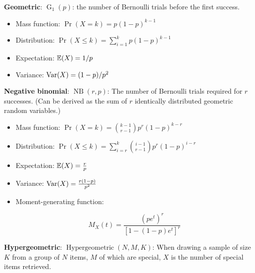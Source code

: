 \textbf{Geometric}:  \(\operatorname{G}_1(p)\): the number of Bernoulli trials before the first success.

\begin{itemize}

\item Mass function: \(\Pr(X = k) = p(1-p)^{k-1} \)

\item Distribution: \(\Pr(X \leq k) = \sum_{i=1}^k p(1-p)^{k-1}  \)

\item Expectation: \(\mathbb{E}(X) = 1/p \)

\item Variance: \(\mathrm{Var}(X) = (1-p)/p^2\)

\end{itemize}


\textbf{Negative binomial}: \( \operatorname{NB}(r, p)\): The number of Bernoulli trials required for \(r\) successes. (Can be derived as the sum of \(r\) identically distributed geometric random variables.)

\begin{itemize}

\item Mass function: \(\Pr(X = k) =  \binom{k-1}{r-1} p^r (1-p)^{k-r}\)

\item Distribution: \(\Pr(X \leq k) = \sum_{i=r}^k \binom{i-1}{r-1} p^r (1-p)^{i-r} \)

\item Expectation: \(\mathbb{E}(X) = \frac{r}{p}\)

\item Variance: \(\mathrm{Var}(X) =  \frac{r(1-p)}{p^2}\)

\item Moment-generating function: 

\[
M_X(t) = \frac{(pe^t)^r}{[1 - (1-p)e^t]^r}
\]

\end{itemize}


\textbf{Hypergeometric}: \( \operatorname{Hypergeometric}(N, M, K)\): When drawing a sample of size \(K\) from a group of \(N\) items, \(M\) of which are special, \(X\) is the number of special items retrieved.

